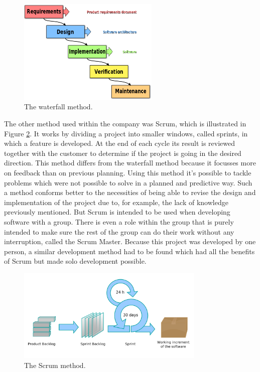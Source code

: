 \begin{figure}[ht]
    \centering
    \includegraphics[width=0.6\textwidth]{plaatjes/waterfall-method}
    \caption{The waterfall method.}
    \label{fig:waterfall-method}
\end{figure}%

The other method used within the company was Scrum, which is illustrated in Figure \ref{fig:scrum-method}. It works by dividing a project into smaller windows, called sprints, in which a feature is developed. At the end of each cycle its result is reviewed together with the customer to determine if the project is going in the desired direction. This method differs from the waterfall method because it focusses more on feedback than on previous planning. Using this method it's possible to tackle problems which were not possible to solve in a planned and predictive way. Such a method conforms better to the necessities of being able to revise the design and implementation of the project due to, for example, the lack of knowledge previously mentioned. But Scrum is intended to be used when developing software with a group. There is even a role within the group that is purely intended to make sure the rest of the group can do their work without any interruption, called the Scrum Master. Because this project was developed by one person, a similar development method had to be found which had all the benefits of Scrum but made solo development possible.

\begin{figure}[ht]
    \centering
    \includegraphics[width=0.8\textwidth]{plaatjes/scrum-method}
    \caption{The Scrum method.}
    \label{fig:scrum-method}
\end{figure}%


